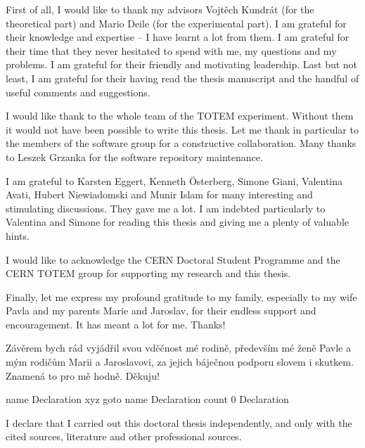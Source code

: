 \bgroup


\vfil

First of all, I would like to thank my advisors Vojtěch Kundrát (for the theoretical part) and Mario Deile (for the experimental part). I am grateful for their knowledge and expertise -- I have learnt a lot from them. I am grateful for their time that they never hesitated to spend with me, my questions and my problems. I am grateful for their friendly and motivating leadership. Last but not least, I am grateful for their having read the thesis manuscript and the handful of useful comments and suggestions.

I would like thank to the whole team of the TOTEM experiment. Without them it would not have been possible to write this thesis. Let me thank in particular to the members of the software group for a constructive collaboration. Many thanks to Leszek Grzanka for the software repository maintenance. 

I am grateful to Karsten Eggert, Kenneth \"Osterberg, Simone Giani, Valentina Avati, Hubert Niewiadomski and Munir Islam for many interesting and stimulating discussions. They gave me a lot. I am indebted particularly to Valentina and Simone for reading this thesis and giving me a plenty of valuable hints.

I would like to acknowledge the CERN Doctoral Student Programme and the CERN TOTEM group for supporting my research and this thesis.

Finally, let me express my profound gratitude to my family, especially to my wife Pavla and my parents Marie and Jaroslav, for their endless support and 
encouragement. It has meant a lot for me. Thanks!

\baselineskip

Závěrem bych rád vyjádřil svou vděčnost mé rodině, především mé ženě Pavle a mým rodičům Marii a Jaroslavovi, za jejich báječnou podporu slovem i skutkem. Znamená to pro mě hodně. Děkuju!


\egroup

\eject
\forceoddpage


\pdfdest name {Declaration} xyz
\pdfoutline goto name {Declaration} count 0 {Declaration}%

I declare that I carried out this doctoral thesis independently, and only with the cited sources, literature and other professional sources.

